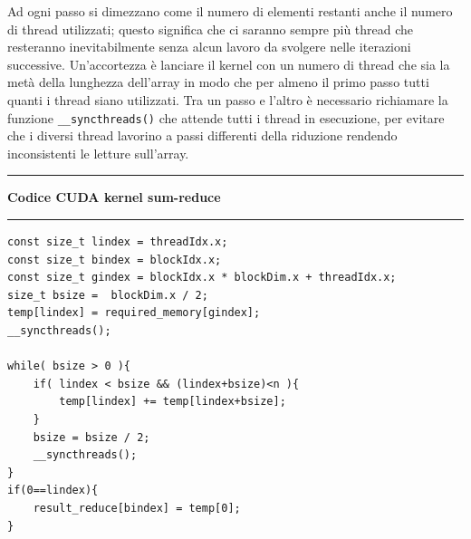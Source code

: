 \documentclass[12pt,a4paper]{report}
\begin{document}
\begin{figure}[H]
\centering
\begin{floatrow}[1]
\end{floatrow}
\end{figure} 
Ad ogni passo si dimezzano come il numero di elementi restanti anche il numero di thread utilizzati; questo significa che ci saranno sempre più thread che resteranno inevitabilmente senza alcun lavoro da svolgere nelle iterazioni successive. \newline
Un'accortezza è lanciare il kernel con un numero di thread che sia la metà della lunghezza dell'array in modo che per almeno il primo passo tutti quanti i thread siano utilizzati. \newline
Tra un passo e l'altro è necessario richiamare la funzione \verb|__syncthreads()| che attende tutti i thread in esecuzione, per evitare che i diversi thread lavorino a passi differenti della riduzione rendendo inconsistenti le letture sull'array.  \newpage
\noindent\rule[0.5ex]{\linewidth}{2pt}
\small{\textbf{Codice CUDA kernel sum-reduce}} \\
\noindent\rule[0.5ex]{\linewidth}{1pt}
\begin{lstlisting}
const size_t lindex = threadIdx.x;
const size_t bindex = blockIdx.x;
const size_t gindex = blockIdx.x * blockDim.x + threadIdx.x;
size_t bsize =  blockDim.x / 2;
temp[lindex] = required_memory[gindex];
__syncthreads();

while( bsize > 0 ){
    if( lindex < bsize && (lindex+bsize)<n ){
        temp[lindex] += temp[lindex+bsize];
    }
    bsize = bsize / 2;
    __syncthreads();
}
if(0==lindex){
    result_reduce[bindex] = temp[0];
} 
\end{lstlisting}
\end{document}
